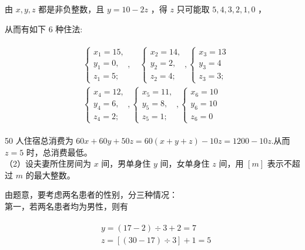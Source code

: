 \documentclass[10pt]{article}
\begin{document}
由 $x, y, z$ 都是非负整数，且 $y=10-2 z$ ，得 $z$ 只可能取 $5,4,3,2,1,0$ ，

从而有如下 6 种住法:

\begin{align*}
\begin{aligned}
& \left\{\begin{array}{l}
x_{1}=15, \\
y_{1}=0, \\
z_{1}=5 ;
\end{array}, \quad\left\{\begin{array}{l}
x_{2}=14, \\
y_{2}=2, \\
z_{2}=4 ;
\end{array},\left\{\begin{array}{l}
x_{3}=13 \\
y_{3}=4 \\
z_{3}=3 ;
\end{array}\right.\right.\right. \\
& \left\{\begin{array}{l}
x_{4}=12, \\
y_{4}=6, \\
z_{4}=2 ;
\end{array},\left\{\begin{array}{l}
x_{5}=11, \\
y_{5}=8, \\
z_{5}=1 ;
\end{array},\left\{\begin{array}{l}
x_{6}=10 \\
y_{6}=10 \\
z_{6}=0
\end{array}\right.\right.\right.
\end{aligned}
\end{align*}

50 人住宿总消费为 $60 x+60 y+50 z=60(x+y+z)-10 z=1200-10 z$.从而 $z=5$ 时，总消费最低。\\
（2）设夫妻所住房间为 $x$ 间，男单身住 $y$ 间，女单身住 $z$ 间，用 $[m]$ 表示不超过 $m$ 的最大整数。

由题意，要考虑两名患者的性别，分三种情况：\\
第一，若两名患者均为男性，则有

\begin{align*}
\begin{aligned}
& y=(17-2) \div 3+2=7 \\
& z=[(30-17) \div 3]+1=5
\end{aligned}
\end{align*}
\end{document}
